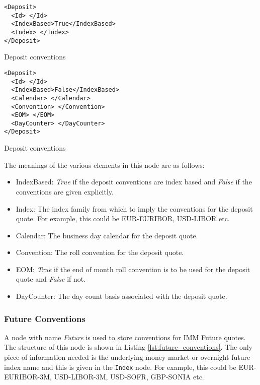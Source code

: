 \begin{listing}[H]
\begin{verbatim}
<Deposit>
  <Id> </Id>
  <IndexBased>True</IndexBased>
  <Index> </Index>
</Deposit>
\end{verbatim}
\caption{Deposit conventions}
\label{lst:deposit_conventions_index}
\end{listing}

\begin{listing}[H]
\begin{verbatim}
<Deposit>
  <Id> </Id>
  <IndexBased>False</IndexBased>
  <Calendar> </Calendar>
  <Convention> </Convention>
  <EOM> </EOM>
  <DayCounter> </DayCounter>
</Deposit>
\end{verbatim}
\caption{Deposit conventions}
\label{lst:deposit_conventions_explicit}
\end{listing}


The meanings of the various elements in this node are as follows:
\begin{itemize}
\item IndexBased: \emph{True} if the deposit conventions are index based and \emph{False} if the conventions are given
explicitly.
\item Index: The index family from which to imply the conventions for the deposit quote. For example, this could be
EUR-EURIBOR, USD-LIBOR etc.
\item Calendar: The business day calendar for the deposit quote.
\item Convention: The roll convention for the deposit quote.
\item EOM: \emph{True} if the end of month roll convention is to be used for the deposit quote and \emph{False} if not.
\item DayCounter: The day count basis associated with the deposit quote.
\end{itemize}

\subsubsection{Future Conventions}
A node with name \emph{Future} is used to store conventions for IMM Future quotes. The structure of this node is shown
in Listing \ref{lst:future_conventions}. The only piece of information needed is the underlying money market or
overnight future index name and this is given in the \lstinline!Index! node. For example, this could be EUR-EURIBOR-3M,
USD-LIBOR-3M, USD-SOFR, GBP-SONIA etc.

